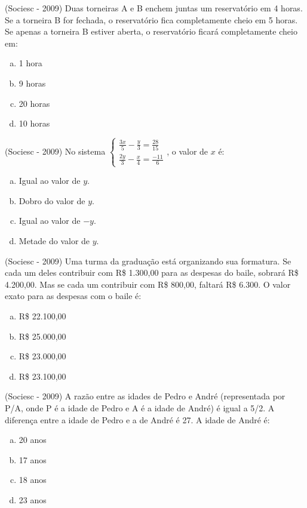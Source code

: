 \begin{exer}
 (Sociesc - 2009) Duas torneiras A e B enchem juntas um reservatório em 4 horas. Se a torneira B for fechada, o reservatório fica completamente cheio em 5 horas. Se apenas a torneira B estiver aberta, o reservatório ficará completamente cheio em:
  \begin{enumerate}[a)]
  \item 1 hora
  \item 9 horas
  \item 20 horas
  \item 10 horas
 \end{enumerate}
 \end{exer}

 \begin{exer}
 (Sociesc - 2009) No sistema
 $\begin{cases}
  \frac{3x}{5} - \frac{y}{3} = \frac{28}{15} \\
  \frac{2y}{3} - \frac{x}{4} = \frac{-11}{6}
 \end{cases}$, o valor de $x$ é:
  \begin{enumerate}[a)]
  \item Igual ao valor de $y$.
  \item Dobro do valor de $y$.
  \item Igual ao valor de $-y$.
  \item Metade do valor de $y$.
 \end{enumerate}
 \end{exer}

 \begin{exer}
 (Sociesc - 2009) Uma turma da graduação está organizando sua formatura. Se cada um deles contribuir com R\$ 1.300,00 para as despesas do baile, sobrará R\$ 4.200,00. Mas se cada um contribuir com R\$ 800,00, faltará R\$ 6.300. O valor exato para as despesas com o baile é:
  \begin{enumerate}[a)]
  \item R\$ 22.100,00
  \item R\$ 25.000,00
  \item R\$ 23.000,00
  \item R\$ 23.100,00
 \end{enumerate}
 \end{exer}

 \begin{exer}
(Sociesc - 2009) A razão entre as idades de Pedro e André (representada por P/A, onde P é a idade de Pedro e A é a idade de André) é igual a 5/2. A diferença entre a idade de Pedro e a de André é 27. A idade de André é:
 \begin{enumerate}[a)]
  \item 20 anos
  \item 17 anos
  \item 18 anos
  \item 23 anos
 \end{enumerate}
 \end{exer}

